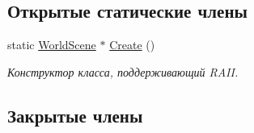\subsection*{Открытые статические члены}
\begin{DoxyCompactItemize}
\item 
static \hyperlink{classrtm_1_1_world_scene}{World\+Scene} $\ast$ \hyperlink{classrtm_1_1_world_scene_a4d9c6dcf1fc6a02c1d090caed0ad6745}{Create} ()
\begin{DoxyCompactList}\small\item\em Конструктор класса, поддерживающий R\+A\+II. \end{DoxyCompactList}\end{DoxyCompactItemize}
\subsection*{Закрытые члены}
